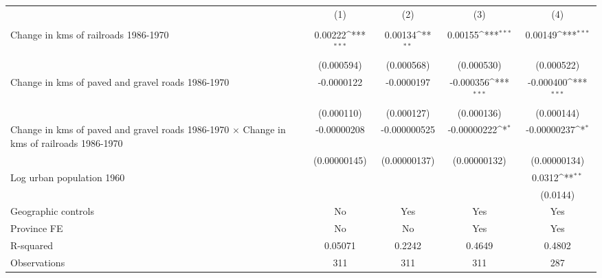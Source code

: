 {
\def\sym#1{\ifmmode^{#1}\else\(^{#1}\)\fi}
\begin{tabular}{l*{4}{c}}
\hline\hline
                &\multicolumn{1}{c}{(1)}&\multicolumn{1}{c}{(2)}&\multicolumn{1}{c}{(3)}&\multicolumn{1}{c}{(4)}\\
                &\multicolumn{1}{c}{}&\multicolumn{1}{c}{}&\multicolumn{1}{c}{}&\multicolumn{1}{c}{}\\
\hline
Change in kms of railroads 1986-1970&  0.00222\sym{***}&  0.00134\sym{**} &  0.00155\sym{***}&  0.00149\sym{***}\\
                &(0.000594)         &(0.000568)         &(0.000530)         &(0.000522)         \\
[1em]
Change in kms of paved and gravel roads 1986-1970&-0.0000122         &-0.0000197         &-0.000356\sym{***}&-0.000400\sym{***}\\
                &(0.000110)         &(0.000127)         &(0.000136)         &(0.000144)         \\
[1em]
Change in kms of paved and gravel roads 1986-1970 $\times$ Change in kms of railroads 1986-1970&-0.00000208         &-0.000000525         &-0.00000222\sym{*}  &-0.00000237\sym{*}  \\
                &(0.00000145)         &(0.00000137)         &(0.00000132)         &(0.00000134)         \\
[1em]
Log urban population 1960&                  &                  &                  &   0.0312\sym{**} \\
                &                  &                  &                  & (0.0144)         \\
\hline
Geographic controls&       No         &      Yes         &      Yes         &      Yes         \\
Province FE     &       No         &       No         &      Yes         &      Yes         \\
R-squared       &  0.05071         &   0.2242         &   0.4649         &   0.4802         \\
Observations    &      311         &      311         &      311         &      287         \\
\hline\hline
\end{tabular}
}
